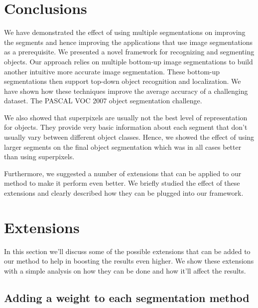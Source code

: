 \documentclass[twoside,11pt]{article}
\begin{document}
\section{Conclusions}

We have demonstrated the effect of using multiple segmentations on improving
the segments and hence improving the applications that use image
segmentations as a prerequisite. We presented a novel framework for recognizing
and segmenting objects. Our approach relies on multiple bottom-up image 
segmentations to build another intuitive more accurate image segmentation.
These bottom-up segmentations then support top-down object recognition
and localization. We have shown how these techniques improve the average accuracy
of a challenging dataset. The PASCAL VOC 2007 object segmentation challenge.

We also showed that superpixels are usually not the best level of representation
for objects. They provide very basic information about each segment that don't
usually vary between different object classes. Hence, we showed the effect of
using larger segments on the final object segmentation which was in all cases
better than using superpixels.

Furthermore, we suggested a number of extensions that can be applied to our
method to make it perform even better. We briefly studied the effect of these
extensions and clearly described how they can be plugged into our framework. 
\section{Extensions}

In this section we'll discuss some of the possible extensions that can be added
to our method to help in boosting the results even higher.
We show these extensions with a simple analysis on how they can be done and how
it'll affect the results.

\subsection{Adding a weight to each segmentation method}
\end{document}
